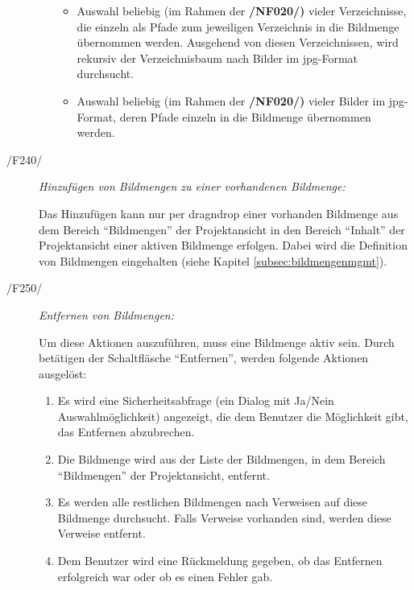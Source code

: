 \begin{description}
\begin{itemize}
\begin{itemize}
						\item Auswahl beliebig (im Rahmen der \textbf{/NF020/)} vieler Verzeichnisse, die einzeln als Pfade zum jeweiligen Verzeichnis in die Bildmenge übernommen werden. Ausgehend von diesen Verzeichnissen, wird rekursiv der Verzeichnisbaum nach Bilder im \gls{jpg}-Format durchsucht.
						
						\item Auswahl beliebig (im Rahmen der \textbf{/NF020/)} vieler Bilder im \gls{jpg}-Format, deren Pfade einzeln in die Bildmenge übernommen werden.
					
					\end{itemize}
				
			\end{itemize}
		
		\item[/F240/] \textit{Hinzufügen von Bildmengen zu einer vorhandenen Bildmenge:}\par Das Hinzufügen kann nur per \gls{dragndrop} einer vorhanden Bildmenge aus dem Bereich "`Bildmengen"' der Projektansicht in den Bereich "`Inhalt"' der Projektansicht einer aktiven Bildmenge erfolgen. Dabei wird die Definition von Bildmengen eingehalten (siehe Kapitel \ref{subsec:bildmengenmgmt}).
		
		\item[/F250/] \textit{Entfernen von Bildmengen:}\par Um diese Aktionen auszuführen, muss eine Bildmenge aktiv sein. Durch betätigen der Schaltfläsche "`Entfernen"', werden folgende Aktionen ausgelöst:
			
			\begin{enumerate}
			
				\item Es wird eine Sicherheitsabfrage (ein Dialog mit Ja/Nein Auswahlmöglichkeit) angezeigt, die dem Benutzer die Möglichkeit gibt, das Entfernen abzubrechen.
				
				\item Die Bildmenge wird aus der Liste der Bildmengen, in dem Bereich "`Bildmengen"' der Projektansicht, entfernt.
				
				\item Es werden alle restlichen Bildmengen nach Verweisen auf diese Bildmenge durchsucht. Falls Verweise vorhanden sind, werden diese Verweise entfernt.
				
				\item Dem Benutzer wird eine Rückmeldung gegeben, ob das Entfernen erfolgreich war oder ob es einen Fehler gab.
				

\end{enumerate}
\end{description}
